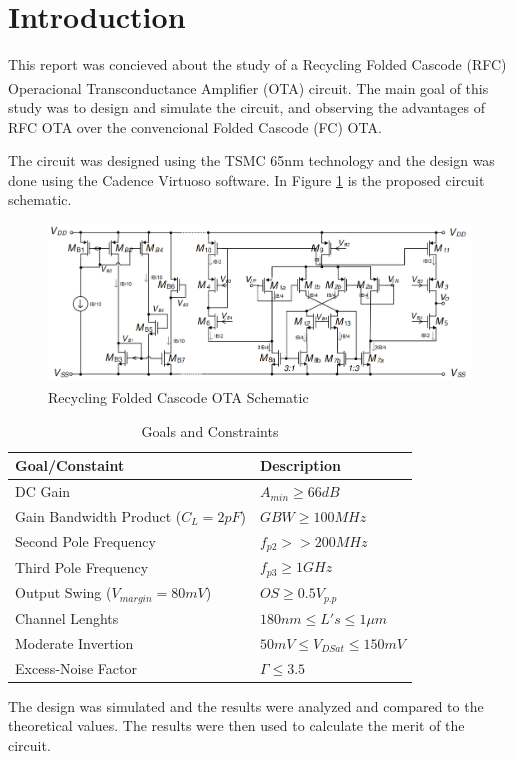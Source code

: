 \section{Introduction}

This report was concieved about the study of a Recycling Folded Cascode (RFC) Operacional Transconductance Amplifier (OTA) circuit\textsuperscript{\cite{artigo-prof}}. The main goal of this study was to design and simulate the circuit, and observing the advantages of RFC OTA over the convencional Folded Cascode (FC) OTA. 

The circuit was designed using the TSMC 65nm technology and the design was done using the Cadence Virtuoso software. In Figure \ref{fig:OTA_schematic} is the proposed circuit schematic.

\begin{figure}[H]
    \centering
    \includegraphics[width=1\textwidth]{Images/RFC_OTA_schematic.png}
    \caption{Recycling Folded Cascode OTA Schematic\textsuperscript{\cite{Lab-statement}}}
    \label{fig:OTA_schematic}
\end{figure}

\begin{table}[h]
    \centering
    \caption{Goals and Constraints}
    \begin{tabularx}{\textwidth}{>{\centering\arraybackslash}X >{\centering\arraybackslash}X}
        \toprule
        \textbf{Goal/Constaint} & \textbf{Description}\\
        \midrule
        DC Gain & $A_{min}\geq 66dB$\\
        \midrule
        Gain Bandwidth Product ($C_L = 2pF$) & $GBW\geq100MHz$ \\
        \midrule
        Second Pole Frequency & $f_{p2}>>200MHz$ \\
        \midrule
        Third Pole Frequency & $f_{p3} \geq 1GHz$ \\
        \midrule
        Output Swing ($V_{margin}=80mV$) & $OS\geq 0.5 V_{p.p}$ \\
        \midrule
        Channel Lenghts & $180nm \leq L's \leq 1 \mu m$ \\
        \midrule
        Moderate Invertion & $50mV \leq V_{DSat} \leq 150mV$ \\
        \midrule
        Excess-Noise Factor & $\Gamma \leq 3.5 $\\
        \bottomrule
    \end{tabularx}
    \label{tab:goals}
\end{table}

The design was simulated and the results were analyzed and compared to the theoretical values. The results were then used to calculate the merit of the circuit.

\pagebreak

